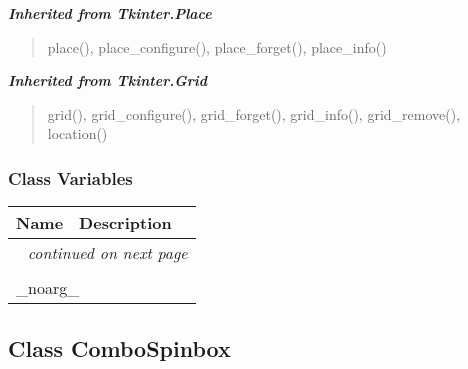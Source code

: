 \large{\textbf{\textit{Inherited from Tkinter.Place}}}

\begin{quote}
place(), place\_configure(), place\_forget(), place\_info()
\end{quote}

\large{\textbf{\textit{Inherited from Tkinter.Grid}}}

\begin{quote}
grid(), grid\_configure(), grid\_forget(), grid\_info(), grid\_remove(), location()
\end{quote}


  \subsubsection{Class Variables}

    \vspace{-1cm}
\hspace{\varindent}\begin{longtable}{|p{\varnamewidth}|p{\vardescrwidth}|l}
\cline{1-2}
\cline{1-2} \centering \textbf{Name} & \centering \textbf{Description}& \\
\cline{1-2}
\endhead\cline{1-2}\multicolumn{3}{r}{\small\textit{continued on next page}}\\\endfoot\cline{1-2}
\endlastfoot\multicolumn{2}{|l|}{\textit{Inherited from Tkinter.Misc}}\\
\multicolumn{2}{|p{\varwidth}|}{\raggedright \_noarg\_}\\
\cline{1-2}
\end{longtable}



\subsection{Class ComboSpinbox}

